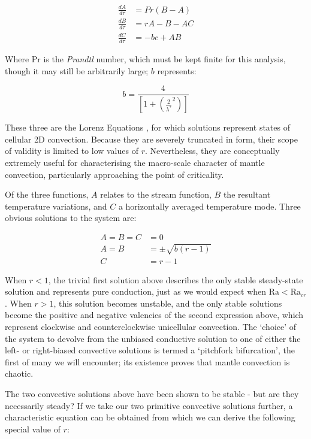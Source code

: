 \documentclass[a4paper,11pt,oneside]{book}
\begin{document}
\begin{align*}
\frac{d A}{d \tau} &= Pr \left( B - A \right) \\
\frac{d B}{d \tau} &= rA - B - AC \\
\frac{d C}{d \tau} &= -bc + AB
\end{align*}

Where $\mathrm{Pr}$ is the \textit{Prandtl} number, which must be kept finite for this analysis, though it may still be arbitrarily large; $b$ represents:

\begin{equation}
b = \frac{4}{\left[ 1 + \left( \frac{2}{\lambda^*}^2 \right) \right]}
\end{equation}

These three are the Lorenz Equations \cite{Lorenz1963-wy}, for which solutions represent states of cellular 2D convection. Because they are severely truncated in form, their scope of validity is limited to low values of $r$. Nevertheless, they are conceptually extremely useful for characterising the macro-scale character of mantle convection, particularly approaching the point of criticality.

Of the three functions, $A$ relates to the stream function, $B$ the resultant temperature variations, and $C$ a horizontally averaged temperature mode. Three obvious solutions to the system are:

\begin{align*}
A = B = C &= 0 \\
A = B &= \pm \sqrt{b \left( r - 1 \right)} \\
C &= r - 1
\end{align*}

When $r<1$, the trivial first solution above describes the only stable steady-state solution and represents pure conduction, just as we would expect when $\mathrm{Ra}<\mathrm{Ra}_{cr}$. When $r>1$, this solution becomes unstable, and the only stable solutions become the positive and negative valencies of the second expression above, which represent clockwise and counterclockwise unicellular convection. The `choice' of the system to devolve from the unbiased conductive solution to one of either the left- or right-biased convective solutions is termed a `pitchfork bifurcation', the first of many we will encounter; its existence proves that mantle convection is chaotic.

The two convective solutions above have been shown to be stable - but are they necessarily steady? If we take our two primitive convective solutions further, a characteristic equation can be obtained from which we can derive the following special value of $r$:
\end{document}
